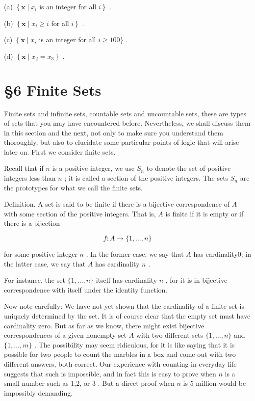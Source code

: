 \documentclass[10pt]{article}
\begin{document}
(a) \(\left\{  {\mathbf{x} \mid  {x}_{i}}\right.\) is an integer for all \(\left. i\right\}\) .

(b) \(\left\{  {\mathbf{x} \mid  {x}_{i} \geq  i}\right.\) for all \(\left. i\right\}\) .

(c) \(\left\{  {\mathbf{x} \mid  {x}_{i}}\right.\) is an integer for all \(i \geq  {100}\}\) .

(d) \(\left\{  {\mathbf{x} \mid  {x}_{2} = {x}_{3}}\right\}\) .

\section*{§6 Finite Sets}

Finite sets and infinite sets, countable sets and uncountable sets, these are types of sets that you may have encountered before. Nevertheless, we shall discuss them in this section and the next, not only to make sure you understand them thoroughly, but also to elucidate some particular points of logic that will arise later on. First we consider finite sets.

Recall that if \(n\) is a positive integer, we use \({S}_{n}\) to denote the set of positive integers less than \(n\) ; it is called a section of the positive integers. The sets \({S}_{n}\) are the prototypes for what we call the finite sets.

Definition. A set is said to be finite if there is a bijective correspondence of \(A\) with some section of the positive integers. That is, \(A\) is finite if it is empty or if there is a bijection

\[
f : A \rightarrow  \{ 1,\ldots ,n\}
\]

for some positive integer \(n\) . In the former case, we say that \(A\) has cardinality0; in the latter case, we say that \(A\) has cardinality \(n\) .

For instance, the set \(\{ 1,\ldots ,n\}\) itself has cardinality \(n\) , for it is in bijective correspondence with itself under the identity function.

Now note carefully: We have not yet shown that the cardinality of a finite set is uniquely determined by the set. It is of course clear that the empty set must have cardinality zero. But as far as we know, there might exist bijective correspondences of a given nonempty set \(A\) with two different sets \(\{ 1,\ldots ,n\}\) and \(\{ 1,\ldots ,m\}\) . The possibility may seem ridiculous, for it is like saying that it is possible for two people to count the marbles in a box and come out with two different answers, both correct. Our experience with counting in everyday life suggests that such is impossible, and in fact this is easy to prove when \(n\) is a small number such as 1,2, or 3 . But a direct proof when \(n\) is 5 million would be impossibly demanding.
\end{document}
